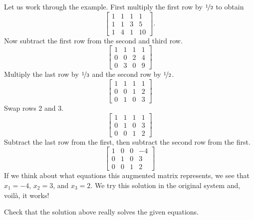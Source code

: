 Let us work through the example.  First multiply the first row by
$\nicefrac{1}{2}$ to obtain
\begin{equation*}
\left[
\begin{array}{ccc|c}
1 & 1 & 1 & 1 \\
1 & 1 & 3 & 5 \\
1 & 4 & 1 & 10
\end{array}
\right] .
\end{equation*}
Now subtract the first row from the second and third row.
\begin{equation*}
\left[
\begin{array}{ccc|c}
1 & 1 & 1 & 1 \\
0 & 0 & 2 & 4 \\
0 & 3 & 0 & 9
\end{array}
\right]
\end{equation*}
Multiply the last row by $\nicefrac{1}{3}$ and the second row by $\nicefrac{1}{2}$.
\begin{equation*}
\left[
\begin{array}{ccc|c}
1 & 1 & 1 & 1 \\
0 & 0 & 1 & 2 \\
0 & 1 & 0 & 3
\end{array}
\right]
\end{equation*}
Swap rows 2 and 3.
\begin{equation*}
\left[
\begin{array}{ccc|c}
1 & 1 & 1 & 1 \\
0 & 1 & 0 & 3 \\
0 & 0 & 1 & 2
\end{array}
\right]
\end{equation*}
Subtract the last row from the first, then subtract the second row
from the first.
\begin{equation*}
\left[
\begin{array}{ccc|c}
1 & 0 & 0 & -4 \\
0 & 1 & 0 & 3 \\
0 & 0 & 1 & 2
\end{array}
\right]
\end{equation*}
If we think about what equations this augmented matrix represents, we see that
$x_1 = -4$, $x_2 = 3$, and $x_3 = 2$.  We try this solution in the original
system and, voil\`a, it works!

\begin{exercise}
Check that the solution above really solves the given equations.
\end{exercise}


